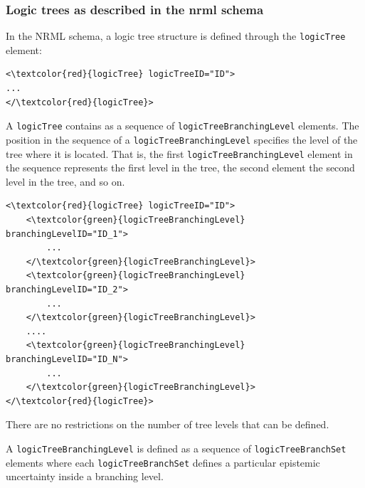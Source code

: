 \subsubsection{Logic trees as described in the nrml schema}
In the NRML schema, a logic tree structure is defined through the 
\Verb+logicTree+ element: 
%
\begin{Verbatim}[frame=single, commandchars=\\\{\}]
<\textcolor{red}{logicTree} logicTreeID="ID">
...
</\textcolor{red}{logicTree}>
\end{Verbatim}
%
A \Verb+logicTree+ contains as a sequence of \Verb+logicTreeBranchingLevel+ 
elements.
The position in the sequence of a \Verb+logicTreeBranchingLevel+ specifies 
the level of the tree where it is located. That is, the first 
\texttt{logicTreeBranchingLevel} element in the sequence represents 
the first level in the tree, the second element the second level in
the tree, and so on.
%
\begin{Verbatim}[frame=single, commandchars=\\\{\}]
<\textcolor{red}{logicTree} logicTreeID="ID">
	<\textcolor{green}{logicTreeBranchingLevel} branchingLevelID="ID_1">
		...
	</\textcolor{green}{logicTreeBranchingLevel}>
	<\textcolor{green}{logicTreeBranchingLevel} branchingLevelID="ID_2">
		...
	</\textcolor{green}{logicTreeBranchingLevel}>
	....
	<\textcolor{green}{logicTreeBranchingLevel} branchingLevelID="ID_N">
		...
	</\textcolor{green}{logicTreeBranchingLevel}>
</\textcolor{red}{logicTree}>
\end{Verbatim}
There are no restrictions on the number of tree levels that can 
be defined.

A \Verb+logicTreeBranchingLevel+ is defined as a sequence of 
\Verb+logicTreeBranchSet+ elements where each \Verb+logicTreeBranchSet+ 
defines a particular epistemic uncertainty inside a branching level. 

